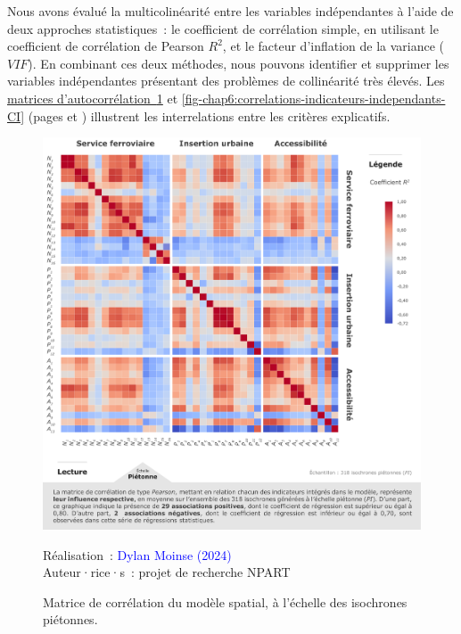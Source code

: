 \begin{refsegment}
Nous avons évalué la multicolinéarité entre les variables indépendantes à l'aide de deux approches statistiques~: le coefficient de corrélation simple, en utilisant le coefficient de corrélation de Pearson \(R^{2}\), et le facteur d'inflation de la variance (\(VIF\)). En combinant ces deux méthodes, nous pouvons identifier et supprimer les variables indépendantes présentant des problèmes de collinéarité très élevés. Les \hyperref[fig-chap6:correlations-indicateurs-independants-PI]{matrices d'autocorrélation~\ref{fig-chap6:correlations-indicateurs-independants-PI}} et \hyperref[fig-chap6:correlations-indicateurs-independants-CI]{\ref{fig-chap6:correlations-indicateurs-independants-CI}} (pages \pageref{fig-chap6:correlations-indicateurs-independants-PI} et \pageref{fig-chap6:correlations-indicateurs-independants-CI}) illustrent les interrelations entre les critères explicatifs.%

    \begin{figure}[h!]\vspace*{4pt}
        \caption{Matrice de corrélation du modèle spatial, à l'échelle des isochrones piétonnes.}
        \label{fig-chap6:correlations-indicateurs-independants-PI}
        \centerline{\includegraphics[width=1\columnwidth]{src/Figures/Chap-6/FR_NPART_Matrice_Correlation_PI.pdf}}
        \vspace{5pt}
        \begin{flushright}\scriptsize{
        Réalisation~: \textcolor{blue}{Dylan Moinse (2024)}
        \\
        Auteur·rice·s~: projet de recherche \acrshort{NPART}
        }\end{flushright}
    \end{figure}


\end{refsegment}

